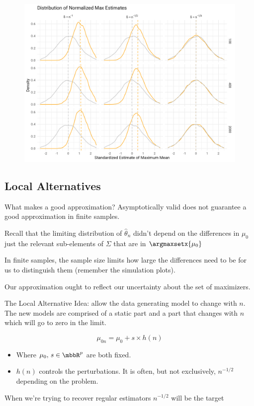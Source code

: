 \documentclass[aspectratio=169, professionalfonts, handout]{beamer}
\begin{document}
\begin{frame}
	\begin{figure}
		\includegraphics[width=.9\textwidth]{figures/max_means_sim_plot}
	\end{figure}
\end{frame}
\subsection{Local Alternatives}
\begin{frame}{What makes a good approximation?}
	Asymptotically valid does not guarantee a good approximation in finite
	samples.

	\vfill


	Recall that the limiting distribution of $\widehat{\theta}_n$ didn't depend on
	the differences in $\mu_0$ just the relevant sub-elements of $\Sigma$ that are in $\argmaxsetx{\mu_0}$


	\vfill
	In finite samples, the sample size limits how large the differences
	need to be for us to distinguish them (remember the simulation plots).

	\vfill

	Our approximation ought to reflect our uncertainty about the set
	of 	maximizers.

\end{frame}

\begin{frame}{The Local Alternative}
	Idea: allow the data generating model to change with $n$. The new models are
	comprised of a static part and a part that changes with $n$ which
	will go to zero in the limit.

	$$\mu_{0n} = \mu_0 + s \times h(n)$$
	\begin{itemize}
		\item Where $\mu_0, \,s \in \mbbR^{p}$ are both fixed.
		      \vfill
		\item $h(n)$ controls the perturbations. It is often, but not
		      exclusively, $n^{-1/2}$ depending on the problem.
	\end{itemize}
	\vfill

	When we're trying to recover regular estimators $n^{-1/2}$ will be the target

\end{frame}
\end{document}
